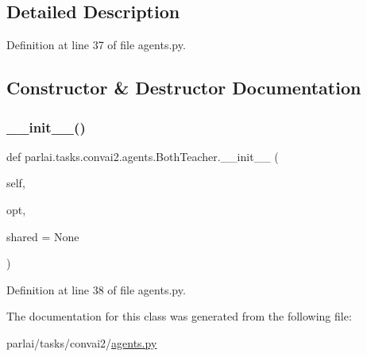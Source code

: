\subsection{Detailed Description}


Definition at line 37 of file agents.\+py.



\subsection{Constructor \& Destructor Documentation}
\mbox{\label{classparlai_1_1tasks_1_1convai2_1_1agents_1_1BothTeacher_acae96b99b1aa547acb06ee854936e50b}} 
\subsubsection{\texorpdfstring{\+\_\+\+\_\+init\+\_\+\+\_\+()}{\_\_init\_\_()}}
{\footnotesize\ttfamily def parlai.\+tasks.\+convai2.\+agents.\+Both\+Teacher.\+\_\+\+\_\+init\+\_\+\+\_\+ (\begin{DoxyParamCaption}\item[{}]{self,  }\item[{}]{opt,  }\item[{}]{shared = {\ttfamily None} }\end{DoxyParamCaption})}



Definition at line 38 of file agents.\+py.



The documentation for this class was generated from the following file\+:\begin{DoxyCompactItemize}
\item 
parlai/tasks/convai2/\hyperlink{parlai_2tasks_2convai2_2agents_8py}{agents.\+py}\end{DoxyCompactItemize}
